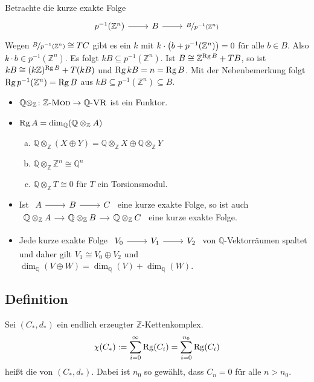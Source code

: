 Betrachte die kurze exakte Folge
\[
	\begin{tikzcd}
		p^{-1}(\mathds{Z}^n) \rar & B \rar & \nicefrac{B}{p ^{-1}(\mathds{Z}^n)}
	\end{tikzcd}
\]
Wegen $\nicefrac{B}{p ^{-1}(\mathds{Z}^n)} \cong T C$ gibt es ein
$k$ mit $k \cdot \enbrace*{b+ p ^{-1}(\mathds{Z}^n)} =0$ für alle $b \in B$. Also $k \cdot b \in p ^{-1}(\mathds{Z}^n)$. Es folgt 
$kB \subseteq  p ^{-1}(\mathds{Z}^n)$. Ist  $B \cong \mathds{Z}^{\Rg B}+ TB$, so ist $k B \cong (k \mathds{Z})^{\Rg B}+ T(kB)$ und $\Rg kB = n = \Rg B$. 
Mit der Nebenbemerkung folgt $\Rg p ^{-1}(\mathds{Z}^n) = \Rg B$ aus $kB \subseteq  p ^{-1}(\mathds{Z}^n) \subseteq B$. \bewende
{}
\begin{itemize}
	\item $\mathds{Q} \otimes_\mathds{Z} \colon \mathds{Z}\text{-}\MOD \to \mathds{Q}\text{-}\VR $ ist ein Funktor.
	\item $\Rg A= \dim_\mathds{Q} (\mathds{Q} \otimes_\mathds{Z} A)$
	\begin{enumerate}[(a)]
		\item $\mathds{Q} \otimes_\mathds{Z} (X \oplus Y) = \mathds{Q} \otimes_\mathds{Z} X \oplus  \mathds{Q} \otimes_\mathds{Z} Y$
		\item $\mathds{Q} \otimes_\mathds{Z} \mathds{Z}^n \cong \mathds{Q}^n$
		\item $\mathds{Q} \otimes_\mathds{Z} T \cong 0$ für $T$ ein Torsionsmodul.
	\end{enumerate}
	\item Ist $\begin{tikzcd}
		A \rar & B \rar & C
	\end{tikzcd}$ eine kurze exakte Folge, so ist auch 
	\(
		\begin{tikzcd}[sep=small]
				\mathds{Q} \otimes_\mathds{Z} A \rar & \mathds{Q} \otimes_\mathds{Z} B \rar & \mathds{Q} \otimes_\mathds{Z} C
			\end{tikzcd}
	\) 
	eine kurze exakte Folge.
	\item Jede kurze exakte Folge $\begin{tikzcd}
		V_0 \rar & V_1 \rar & V_2
	\end{tikzcd}$ von $\mathds{Q}$-Vektorräumen spaltet und daher gilt $V_1 \cong V_0 \oplus V_2$ und $\dim_\mathds{Q}(V \oplus W) = \dim_\mathds{Q}(V)+ \dim_\mathds{Q} (W)$.
\end{itemize}

\subsection[Definition: Eulercharakteristik von $\mathds{Z}$-Kettenkomplexen]{Definition} %
\label{sub:49}
Sei $(C_*,d_*)$ ein endlich erzeugter $\mathds{Z}$-Kettenkomplex.
\[
	\chi(C_*) := \sum_{i=0}^{\infty} \Rg(C_i) = \sum_{i=0}^{n_0} \Rg(C_i) 
\]
heißt die  von $(C_*,d_*)$. Dabei ist $n_0$ so gewählt, dass $C_n =0$ für alle 
$n >n_0$. 

